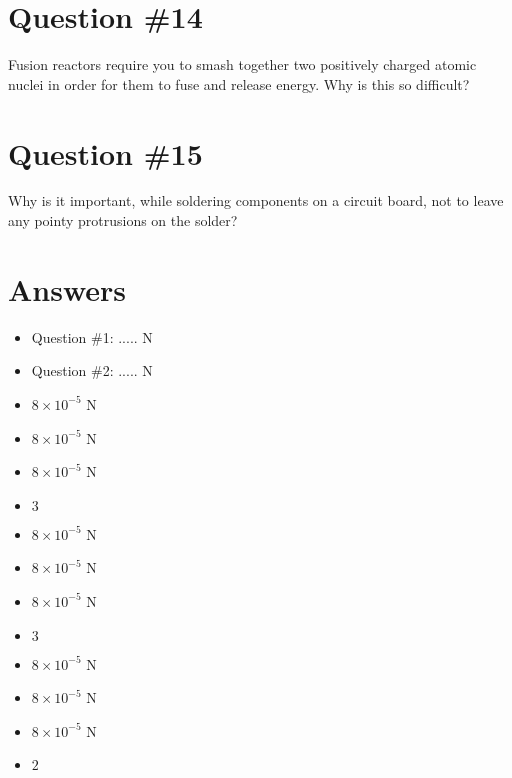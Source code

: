 \documentclass[12pt]{article}
\begin{document}
\section*{Question \#14}
Fusion reactors require you to smash together two positively charged atomic nuclei in order for them to fuse and release energy.  Why is this so difficult?

\section*{Question \#15}
Why is it important, while soldering components on a circuit board, not to leave any pointy protrusions on the solder?

\section*{Answers}

\begin{itemize}
\item Question \#1: ..... N
\item Question \#2: ..... N
\item $8 \times 10^{-5}$ N
\item $8 \times 10^{-5}$ N
\item $8 \times 10^{-5}$ N
\item $3$
\item $8 \times 10^{-5}$ N
\item $8 \times 10^{-5}$ N
\item $8 \times 10^{-5}$ N
\item $3$
\item $8 \times 10^{-5}$ N
\item $8 \times 10^{-5}$ N
\item $8 \times 10^{-5}$ N
\item $2$
\end{itemize}







%
\end{document}
